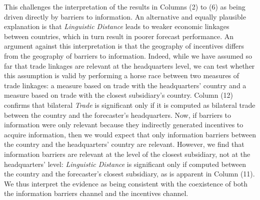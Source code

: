 This challenges the interpretation of the results in Columns (2) to (6) as being driven directly by barriers to information. An alternative and equally plausible explanation is that \textit{Linguistic Distance} leads to weaker economic linkages between countries, which in turn result in poorer forecast performance. %
An argument against this interpretation is that the geography of incentives differs from the geography of barriers to information. Indeed, while we have assumed so far that trade linkages are relevant at the headquarters level, we can test whether this assumption is valid by performing a horse race between two measures of trade linkages: a measure based on trade with the headquarters' country and a measure based on trade with the closest subsidiary's country. Column (12) confirms that bilateral \textit{Trade} is significant only if it is computed as bilateral trade between the country and the forecaster's headquarters. Now, if barriers to information were only relevant because they indirectly generated incentives to acquire information, then we would expect that only information barriers between the country and the headquarters' country are relevant. However, we find that information barriers are relevant at the level of the closest subsidiary, not at the headquarters' level: \textit{Linguistic Distance} is significant only if computed between the country and the forecaster's closest subsidiary, as is apparent in Column (11). We thus interpret the evidence as being consistent with the coexistence of both the information barriers channel and the incentives channel.



